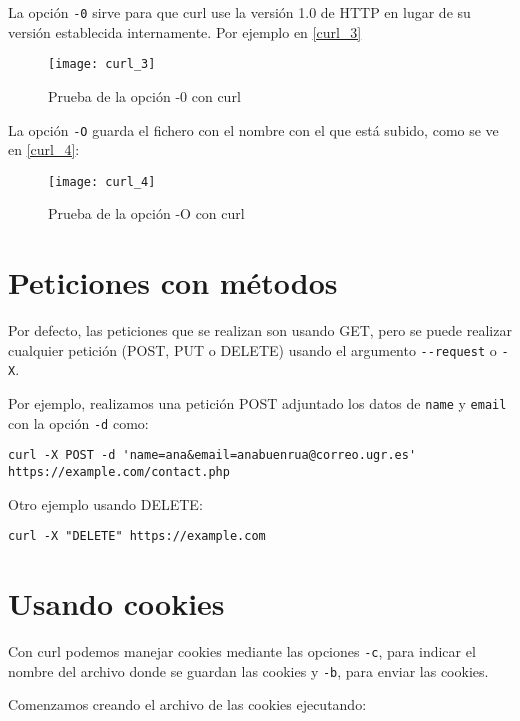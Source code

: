 La opción \verb|-0| sirve para que curl use la versión 1.0 de HTTP en lugar de su versión establecida internamente. Por ejemplo en \eqref{curl_3}

\begin{figure}[h!]
\begin{center}
\caption{Prueba de la opción -0 con curl }
\label{curl_3}
\texttt{[image: curl\_3]}
\end{center}
\end{figure}

La opción \verb|-O| guarda el fichero con el nombre con el que está subido, como se ve en \eqref{curl_4}:

\begin{figure}[h!]
\begin{center}
\caption{Prueba de la opción -O con curl}
\label{curl_4}
\texttt{[image: curl\_4]}
\end{center}
\end{figure}

\section{Peticiones con métodos}

Por defecto, las peticiones que se realizan son usando GET, pero se puede realizar cualquier petición (POST, PUT o DELETE) usando el argumento \verb|--request| o \verb|-X|.

Por ejemplo, realizamos una petición POST adjuntado los datos de \verb|name| y \verb|email| con la opción \verb|-d| como:
\begin{verbatim}
curl -X POST -d 'name=ana&email=anabuenrua@correo.ugr.es' https://example.com/contact.php
\end{verbatim}

Otro ejemplo usando DELETE:
\begin{verbatim}
curl -X "DELETE" https://example.com
\end{verbatim}

\section{Usando cookies}

Con curl podemos manejar cookies mediante las opciones \verb|-c|, para indicar el nombre del archivo donde se guardan las cookies y \verb|-b|, para enviar las cookies.

Comenzamos creando el archivo de las cookies ejecutando:

